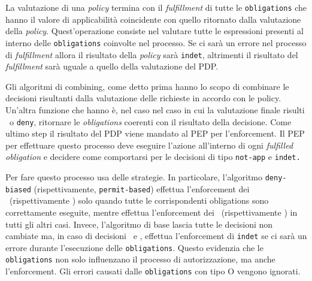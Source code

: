 La valutazione di una \textit{policy} termina con il \textit{fulfillment} di tutte le \texttt{obligations} che hanno il valore di applicabilità coincidente con quello ritornato dalla valutazione della \textit{policy}. Quest'operazione consiste nel valutare tutte le espressioni presenti al interno delle \texttt{obligations} coinvolte nel processo. Se ci sarà un errore nel processo di \textit{fulfillment} allora il risultato della \textit{policy} sarà \texttt{indet}, altrimenti il risultato del \textit{fulfillment} sarà uguale a quello della valutazione del PDP.\\ \par
Gli algoritmi di combining, come detto prima hanno lo scopo di combinare le decisioni risultanti dalla valutazione delle richieste in accordo con le policy. Un'altra funzione che hanno è, nel caso nel caso in cui la valutazione finale risulti \permit \ o \texttt{deny}, ritornare le \textit{obligations} coerenti con il risultato della decisione.  
Come ultimo step il risultato del PDP viene mandato al PEP per l'enforcement.
Il PEP per effettuare questo processo deve eseguire l'azione all'interno di ogni \textit{fulfilled obligation} e decidere come comportarsi per le decisioni di tipo \texttt{not-app} e \texttt{indet.}\\ \par
Per fare questo processo usa delle strategie. In particolare, l'algoritmo \texttt{deny-biased} (rispettivamente, \texttt{permit-based}) effettua l'enforcement dei \permit \ (rispettivamente \deny) solo quando tutte le corrispondenti obligations sono correttamente eseguite, mentre effettua l'enforcement dei \deny \  (rispettivamente \permit) in tutti gli altri casi. Invece, l'algoritmo di base lascia tutte le decisioni non cambiate ma, in caso di decisioni \permit \ e \deny, effettua l'enforcement di \texttt{indet} se ci sarà un errore durante l'esecuzione delle \texttt{obligations}. Questo evidenzia che le \texttt{obligations} non solo influenzano il processo di autorizzazione, ma anche l'enforcement. Gli errori causati dalle \texttt{obligations} con tipo O vengono ignorati.

